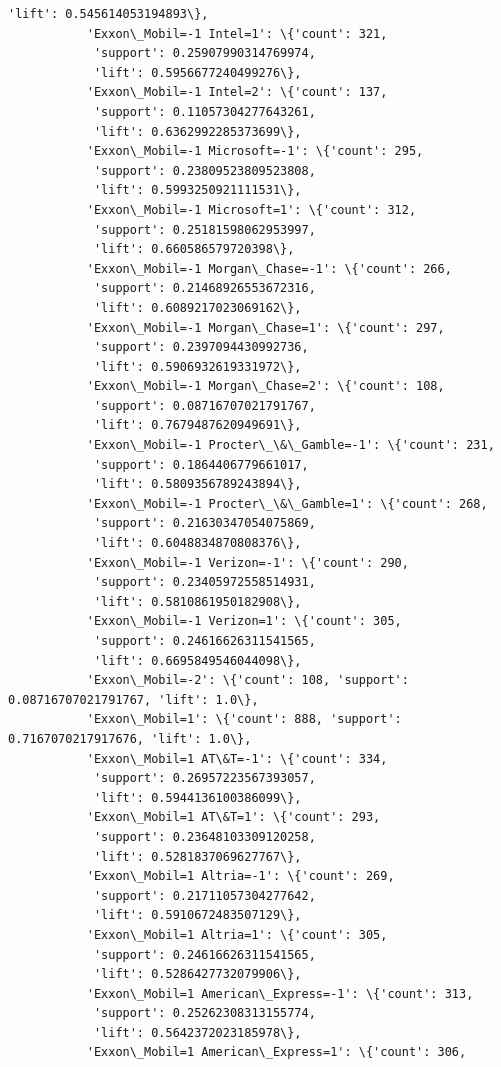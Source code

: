 \documentclass[11pt]{article}
\begin{document}
\begin{Verbatim}[commandchars=\\\{\}]
            'lift': 0.545614053194893\},
           'Exxon\_Mobil=-1 Intel=1': \{'count': 321,
            'support': 0.25907990314769974,
            'lift': 0.5956677240499276\},
           'Exxon\_Mobil=-1 Intel=2': \{'count': 137,
            'support': 0.11057304277643261,
            'lift': 0.6362992285373699\},
           'Exxon\_Mobil=-1 Microsoft=-1': \{'count': 295,
            'support': 0.23809523809523808,
            'lift': 0.5993250921111531\},
           'Exxon\_Mobil=-1 Microsoft=1': \{'count': 312,
            'support': 0.25181598062953997,
            'lift': 0.660586579720398\},
           'Exxon\_Mobil=-1 Morgan\_Chase=-1': \{'count': 266,
            'support': 0.21468926553672316,
            'lift': 0.6089217023069162\},
           'Exxon\_Mobil=-1 Morgan\_Chase=1': \{'count': 297,
            'support': 0.2397094430992736,
            'lift': 0.5906932619331972\},
           'Exxon\_Mobil=-1 Morgan\_Chase=2': \{'count': 108,
            'support': 0.08716707021791767,
            'lift': 0.7679487620949691\},
           'Exxon\_Mobil=-1 Procter\_\&\_Gamble=-1': \{'count': 231,
            'support': 0.1864406779661017,
            'lift': 0.5809356789243894\},
           'Exxon\_Mobil=-1 Procter\_\&\_Gamble=1': \{'count': 268,
            'support': 0.21630347054075869,
            'lift': 0.6048834870808376\},
           'Exxon\_Mobil=-1 Verizon=-1': \{'count': 290,
            'support': 0.23405972558514931,
            'lift': 0.5810861950182908\},
           'Exxon\_Mobil=-1 Verizon=1': \{'count': 305,
            'support': 0.24616626311541565,
            'lift': 0.6695849546044098\},
           'Exxon\_Mobil=-2': \{'count': 108, 'support': 0.08716707021791767, 'lift': 1.0\},
           'Exxon\_Mobil=1': \{'count': 888, 'support': 0.7167070217917676, 'lift': 1.0\},
           'Exxon\_Mobil=1 AT\&T=-1': \{'count': 334,
            'support': 0.26957223567393057,
            'lift': 0.5944136100386099\},
           'Exxon\_Mobil=1 AT\&T=1': \{'count': 293,
            'support': 0.23648103309120258,
            'lift': 0.5281837069627767\},
           'Exxon\_Mobil=1 Altria=-1': \{'count': 269,
            'support': 0.21711057304277642,
            'lift': 0.5910672483507129\},
           'Exxon\_Mobil=1 Altria=1': \{'count': 305,
            'support': 0.24616626311541565,
            'lift': 0.5286427732079906\},
           'Exxon\_Mobil=1 American\_Express=-1': \{'count': 313,
            'support': 0.25262308313155774,
            'lift': 0.5642372023185978\},
           'Exxon\_Mobil=1 American\_Express=1': \{'count': 306,

\end{Verbatim}
\end{document}

